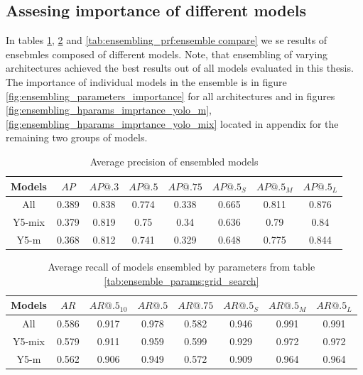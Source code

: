 \subsection{Assesing importance of different models}
In tables \ref{tab:precision:ensemble_compare}, \ref{tab:recall:ensemble_compare} and \ref{tab:ensembling_prf:ensemble compare} we se results of ensebmles composed of different models. Note, that ensembling of varying architectures achieved the best results out of all models evaluated in this thesis. The importance of individual models in the ensemble is in figure \ref{fig:ensembling_parameters_importance} for all architectures and in figures \ref{fig:ensembling_hparams_imprtance_yolo_m}, \ref{fig:ensembling_hparams_imprtance_yolo_mix} located in appendix for the remaining two groups of models.

\begin{table}[h]
    \centering
    \begin{tabular}{|c|c|c|c|c|c|c|c|}
        \hline
        Models & $AP$  & $AP@.3$ & $AP@.5$ & $AP@.75$ & $AP@.5_S$ & $AP@.5_M$ & $AP@.5_L$ \\ \hline
        All    & 0.389 & 0.838   & 0.774   & 0.338    & 0.665     & 0.811     & 0.876     \\ \hline
        Y5-mix & 0.379 & 0.819   & 0.75    & 0.34     & 0.636     & 0.79      & 0.84      \\ \hline
        Y5-m   & 0.368 & 0.812   & 0.741   & 0.329    & 0.648     & 0.775     & 0.844     \\ \hline
    \end{tabular}
    \caption{Average precision of ensembled models}
    \label{tab:precision:ensemble_compare}
\end{table}


\begin{table}[h]
    \centering
    \begin{tabular}{|c|c|c|c|c|c|c|c|}
        \hline
        Models & $AR$  & $AR@.5_{10}$ & $AR@.5$ & $AR@.75$ & $AR@.5_S$ & $AR@.5_M$ & $AR@.5_L$ \\ \hline
        All    & 0.586 & 0.917        & 0.978   & 0.582    & 0.946     & 0.991     & 0.991     \\ \hline
        Y5-mix & 0.579 & 0.911        & 0.959   & 0.599    & 0.929     & 0.972     & 0.972     \\ \hline
        Y5-m   & 0.562 & 0.906        & 0.949   & 0.572    & 0.909     & 0.964     & 0.964     \\ \hline
    \end{tabular}
    \caption{Average recall of models ensembled by parameters from table \ref{tab:ensemble_params:grid_search}}
    \label{tab:recall:ensemble_compare}
\end{table}


